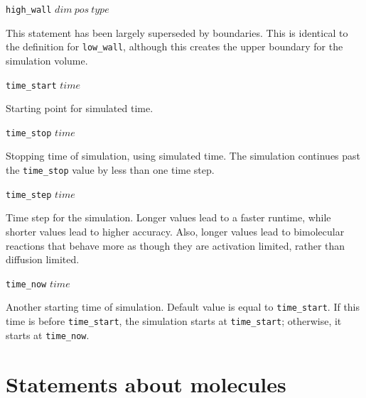 \documentclass {scrbook}
\newcommand {\ttt} {\texttt}
\begin{document}
\begin{description}
\item{\ttt{high\_wall} $dim\ pos\ type$}

This statement has been largely superseded by boundaries. This is identical to the definition for \ttt{low\_wall}, although this creates the upper boundary for the simulation volume.

\item{\ttt{time\_start} $time$}

Starting point for simulated time.

\item{\ttt{time\_stop} $time$}

Stopping time of simulation, using simulated time. The simulation continues past the \ttt{time\_stop} value by less than one time step.

\item{\ttt{time\_step} $time$}

Time step for the simulation. Longer values lead to a faster runtime, while shorter values lead to higher accuracy. Also, longer values lead to bimolecular reactions that behave more as though they are activation limited, rather than diffusion limited.

\item{\ttt{time\_now} $time$}

Another starting time of simulation. Default value is equal to \ttt{time\_start}. If this time is before \ttt{time\_start}, the simulation starts at \ttt{time\_start}; otherwise, it starts at \ttt{time\_now}.

\end{description}

\section{Statements about molecules}
\end{document}
